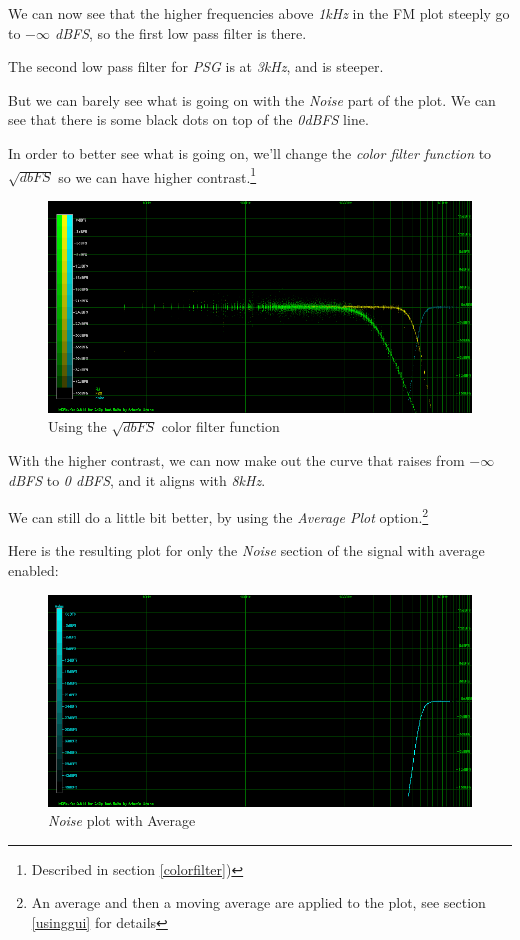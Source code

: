 \documentclass[10pt,a4paper]{report}
\begin{document}
We can now see that the higher frequencies above \textit{1kHz} in the FM plot steeply go to \textit{$-\infty$ dBFS}, so the first low pass filter is there.

The second low pass filter for \textit{PSG} is at \textit{3kHz}, and is steeper.

But we can barely see what is going on with the \textit{Noise} part of the plot. We can see that there is some black dots on top of the \textit{0dBFS} line.

In order to better see what is going on, we'll change the \textit{color filter function} to $\sqrt{dbFS}$ so we can have higher contrast.\footnote{Described in section \ref{colorfilter})}

\begin{figure}[H]
	\centering
	\includegraphics[width=1.0\linewidth]{images/interpretation/Plot4-2-All-sqrt.png}
	\caption[Using SQRT]{Using the $\sqrt{dbFS}$ color filter function}
	\label{fig:plot4-2-all-sqrt}
\end{figure}

With the higher contrast, we can now make out the curve that raises from \textit{$-\infty$ dBFS} to \textit{0 dBFS}, and it aligns with \textit{8kHz}.

We can still do a little bit better, by using the \textit{Average Plot} option.\footnote{An average and then a moving average are applied to the plot, see section \ref{usinggui} for details}

Here is the resulting plot for only the \textit{Noise} section of the signal with average enabled:

\begin{figure}[H]
	\centering
	\includegraphics[width=1.0\linewidth]{images/interpretation/Plot4-3-AVG-Noise.png}
	\caption[Noise Average]{\textit{Noise} plot with Average}
	\label{fig:plot4-3-avg-noise}
\end{figure}
\end{document}
